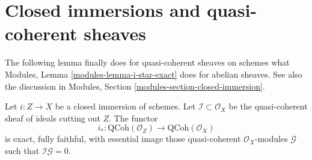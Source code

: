 \section{Closed immersions and quasi-coherent sheaves}
\label{section-closed-immersions-quasi-coherent}

\noindent
The following lemma finally does for quasi-coherent sheaves on schemes
what Modules, Lemma \ref{modules-lemma-i-star-exact} does for abelian sheaves.
See also the discussion in
Modules, Section \ref{modules-section-closed-immersion}.

\begin{lemma}
\label{lemma-i-star-equivalence}
Let $i : Z \to X$ be a closed immersion of schemes. Let
$\mathcal{I} \subset \mathcal{O}_X$ be the quasi-coherent sheaf of ideals
cutting out $Z$. The functor
$$
i_* :
\text{QCoh}(\mathcal{O}_Z)
\longrightarrow
\text{QCoh}(\mathcal{O}_X)
$$
is exact, fully faithful, with essential image those quasi-coherent
$\mathcal{O}_X$-modules $\mathcal{G}$ such that $\mathcal{I}\mathcal{G} = 0$.
\end{lemma}

